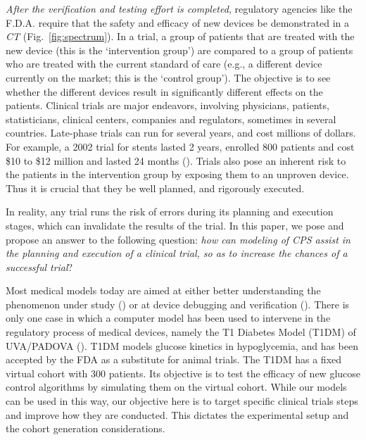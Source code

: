 \emph{After the verification and testing effort is completed}, regulatory agencies like the F.D.A. require that the safety and efficacy of new devices be demonstrated in a \emph{CT} (Fig.~\ref{fig:spectrum}).
In a trial, a group of patients that are treated with the new device (this is the `intervention group') are compared to a group of patients who are treated with the current standard of care (e.g., a different device currently on the market; this is the `control group').
The objective is to see whether the different devices result in significantly different effects on the patients.
Clinical trials are major endeavors, involving physicians, patients, statisticians, clinical centers, companies and regulators, sometimes in several countries.
Late-phase trials can run for several years, and cost millions of dollars.
For example, a 2002 trial for stents lasted 2 years, enrolled 800 patients and cost \$10 to \$12 million and lasted 24 months (\cite{Kaplan04_Cost}).
Trials also pose an inherent risk to the patients in the intervention group by exposing them to an unproven device.
Thus it is crucial that they be well planned, and rigorously executed.

In reality, any trial runs the risk of errors during its planning and execution stages, which can invalidate the results of the trial.
In this paper, we pose and propose an answer to the following question: \emph{how can modeling of CPS assist in the planning and execution of a clinical trial, so as to increase the chances of a successful trial}?

Most medical models today are aimed at either better understanding the phenomenon under study (\cite{vfiborganization_Tusscher07}) or at device debugging and verification (\cite{VHM_proc}). 
There is only one case in which a computer model has been used to intervene in the regulatory process of medical devices, namely the T1 Diabetes Model (T1DM) of UVA/PADOVA (\cite{T1DM}).
T1DM models glucose kinetics in hypoglycemia, and has been accepted by the FDA as a substitute for animal trials.
The T1DM has a fixed virtual cohort with 300 patients.
Its objective is to test the efficacy of new glucose control algorithms by simulating them on the virtual cohort.
While our models can be used in this way, our objective here is to target specific clinical trials steps and improve how they are conducted.
This dictates the experimental setup and the cohort generation considerations.

